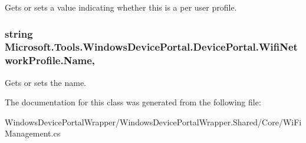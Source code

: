 Gets or sets a value indicating whether this is a per user profile. 

\subsubsection[{\texorpdfstring{Name}{Name}}]{\setlength{\rightskip}{0pt plus 5cm}string Microsoft.\+Tools.\+Windows\+Device\+Portal.\+Device\+Portal.\+Wifi\+Network\+Profile.\+Name\hspace{0.3cm}{\ttfamily [get]}, {\ttfamily [set]}}\hypertarget{class_microsoft_1_1_tools_1_1_windows_device_portal_1_1_device_portal_1_1_wifi_network_profile_a06125b7b5588eb9ccda99ae59320f7a9}{}\label{class_microsoft_1_1_tools_1_1_windows_device_portal_1_1_device_portal_1_1_wifi_network_profile_a06125b7b5588eb9ccda99ae59320f7a9}


Gets or sets the name. 



The documentation for this class was generated from the following file\+:\begin{DoxyCompactItemize}
\item 
Windows\+Device\+Portal\+Wrapper/\+Windows\+Device\+Portal\+Wrapper.\+Shared/\+Core/Wi\+Fi\+Management.\+cs\end{DoxyCompactItemize}
